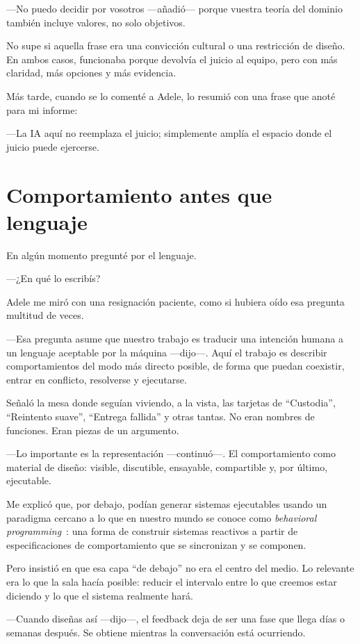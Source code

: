 \documentclass[11pt,a4paper]{article}
\begin{document}
---No puedo decidir por vosotros ---añadió--- porque vuestra teoría del
dominio también incluye valores, no solo objetivos.

No supe si aquella frase era una convicción cultural o una restricción de
diseño. En ambos casos, funcionaba porque devolvía el juicio al equipo, pero
con más claridad, más opciones y más evidencia.

Más tarde, cuando se lo comenté a Adele, lo resumió con una frase que anoté
para mi informe:

---La IA aquí no reemplaza el juicio; simplemente amplía el espacio donde el
juicio puede ejercerse.

\section{Comportamiento antes que lenguaje}

En algún momento pregunté por el lenguaje.

---¿En qué lo escribís?

Adele me miró con una resignación paciente, como si hubiera oído esa pregunta
multitud de veces.

---Esa pregunta asume que nuestro trabajo es traducir una intención humana a
un lenguaje aceptable por la máquina ---dijo---. Aquí el trabajo es describir
comportamientos del modo más directo posible, de forma que puedan coexistir,
entrar en conflicto, resolverse y ejecutarse.

Señaló la mesa donde seguían viviendo, a la vista, las tarjetas de
``Custodia'', ``Reintento suave'', ``Entrega fallida'' y otras tantas. No eran
nombres de funciones. Eran piezas de un argumento.

---Lo importante es la representación ---continuó---. El comportamiento como
material de diseño: visible, discutible, ensayable, compartible y, por último,
ejecutable.

Me explicó que, por debajo, podían generar sistemas ejecutables usando un
paradigma cercano a lo que en nuestro mundo se conoce como \emph{behavioral
programming}~\cite{harel}: una forma de construir sistemas reactivos a partir
de especificaciones de comportamiento que se sincronizan y se componen.

Pero insistió en que esa capa ``de debajo'' no era el centro del medio. Lo
relevante era lo que la sala hacía posible: reducir el intervalo entre lo que
creemos estar diciendo y lo que el sistema realmente hará.

---Cuando diseñas así ---dijo---, el feedback deja de ser una fase que llega
días o semanas después. Se obtiene mientras la conversación está ocurriendo.
\end{document}
